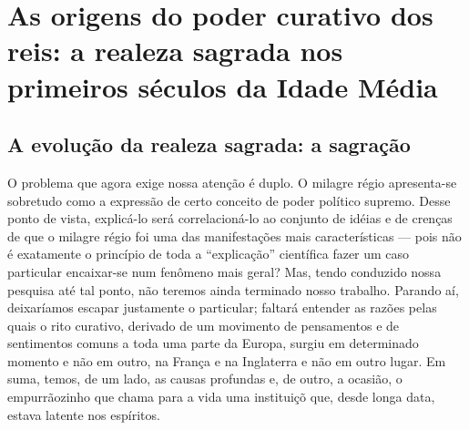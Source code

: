 

\chapter{As origens do poder curativo dos reis: a realeza sagrada nos primeiros séculos da Idade Média} 


\section{A evolução da realeza sagrada: a sagração}
O problema que agora exige nossa atenção é duplo. O milagre régio apresenta-se sobretudo como a expressão de certo conceito de poder político supremo. Desse ponto de vista, explicá-lo será correlacioná-lo ao conjunto de idéias e de crenças de que o milagre régio foi uma das manifestações mais características --- pois não é exatamente o princípio de toda a ``explicação'' científica fazer um caso particular encaixar-se num fenômeno mais geral? Mas, tendo conduzido nossa pesquisa até tal ponto, não teremos ainda terminado nosso trabalho. Parando aí, deixaríamos escapar justamente o particular; faltará entender as razões pelas quais o rito curativo, derivado de um movimento de pensamentos e de sentimentos comuns a toda uma parte da Europa, surgiu em determinado momento e não em outro, na França e na Inglaterra e não em outro lugar. Em suma, temos, de um lado, as causas profundas e, de outro, a ocasião, o empurrãozinho que chama para a vida uma instituiçõ que, desde longa data, estava latente nos espíritos.

